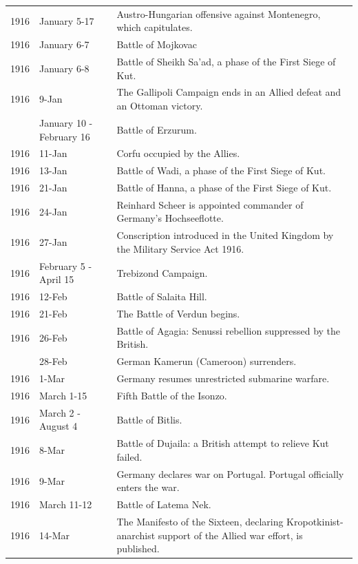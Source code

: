 \documentclass[
  openany]{book}
\begin{document}
\begin{longtable}[t]{rl>{\raggedright\arraybackslash}p{22em}}
1916 & January 5-17 & Austro-Hungarian offensive against Montenegro, which capitulates.\\
\rowcolor{gray!6}  1916 & January 6-7 & Battle of Mojkovac\\
1916 & January 6-8 & Battle of Sheikh Sa'ad, a phase of the First Siege of Kut.\\
\rowcolor{gray!6}  1916 & 9-Jan & The Gallipoli Campaign ends in an Allied defeat and an Ottoman victory.\\
\addlinespace
1916 & January 10 - February 16 & Battle of Erzurum.\\
\rowcolor{gray!6}  1916 & 11-Jan & Corfu occupied by the Allies.\\
1916 & 13-Jan & Battle of Wadi, a phase of the First Siege of Kut.\\
\rowcolor{gray!6}  1916 & 21-Jan & Battle of Hanna, a phase of the First Siege of Kut.\\
1916 & 24-Jan & Reinhard Scheer is appointed commander of Germany's Hochseeflotte.\\
\addlinespace
\rowcolor{gray!6}  1916 & 27-Jan & Conscription introduced in the United Kingdom by the Military Service Act 1916.\\
1916 & February 5 - April 15 & Trebizond Campaign.\\
\rowcolor{gray!6}  1916 & 12-Feb & Battle of Salaita Hill.\\
1916 & 21-Feb & The Battle of Verdun begins.\\
\rowcolor{gray!6}  1916 & 26-Feb & Battle of Agagia: Senussi rebellion suppressed by the British.\\
\addlinespace
1916 & 28-Feb & German Kamerun (Cameroon) surrenders.\\
\rowcolor{gray!6}  1916 & 1-Mar & Germany resumes unrestricted submarine warfare.\\
1916 & March 1-15 & Fifth Battle of the Isonzo.\\
\rowcolor{gray!6}  1916 & March 2 - August 4 & Battle of Bitlis.\\
1916 & 8-Mar & Battle of Dujaila: a British attempt to relieve Kut failed.\\
\addlinespace
\rowcolor{gray!6}  1916 & 9-Mar & Germany declares war on Portugal. Portugal officially enters the war.\\
1916 & March 11-12 & Battle of Latema Nek.\\
\rowcolor{gray!6}  1916 & 14-Mar & The Manifesto of the Sixteen, declaring Kropotkinist-anarchist support of the Allied war effort, is published.\\

\end{longtable}
\end{document}
